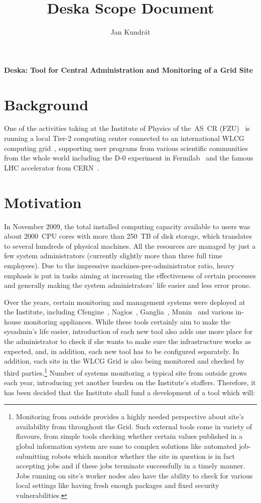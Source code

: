 \documentclass[12pt]{article}
\author{Jan Kundrát}
\title{Deska Scope Document}
\begin{document}
{\huge \textbf{Deska: Tool for Central Administration and Monitoring of a Grid Site}}

\vspace{0.5in}

\section{Background}

One of the activities taking at the Institute of Physics of the~AS~CR (FZU)~\cite{fzu} is running a local Tier-2 computing center
connected to an international WLCG computing grid~\cite{wlcg}, supporting user programs from various scientific communities from
the whole world including the D-0 experiment in Fermilab~\cite{d0} and the famous LHC accelerator from CERN~\cite{lhc}.

\section{Motivation}

In November 2009, the total installed computing capacity available to users was about 2000~CPU cores with more than 250~TB of
disk storage, which translates to several hundreds of physical machines.  All the resources are managed by just a few system
administrators (currently slightly more than three full time employees).  Due to the impressive machines-per-administrator ratio,
heavy emphasis is put in tasks aiming at increasing the effectiveness of certain processes and generally making the system
administrators' life easier and less error prone.

Over the years, certain monitoring and management systems were deployed at the Institute, including Cfengine~\cite{cfengine},
Nagios~\cite{nagios}, Ganglia~\cite{ganglia}, Munin~\cite{munin} and various in-house monitoring appliances.  While these tools
certainly aim to make the sysadmin's life easier, introduction of each new tool also adds one more place for the administrator to
check if she wants to make sure the infrastructure works as expected, and, in addition, each new tool has to be configured
separately.  In addition, each site in the WLCG Grid is also being monitored and checked by third parties.\footnote{Monitoring from
outside provides a highly needed perspective about site's availability from throughout the Grid.  Such external tools come in
variety of flavours, from simple tools checking whether certain values published in a global information system are sane to
complex solutions like automated job-submitting robots which monitor whether the site in question is in fact accepting jobs and if
these jobs terminate successfully in a timely manner.  Jobs running on site's worker nodes also have the ability to check for
various local settings like having fresh enough packages and fixed security vulnerabilities.}  Number of systems
monitoring a typical site from outside grows each year, introducing yet another burden on the Institute's staffers.  Therefore, it
has been decided that the Institute shall fund a development of a tool which will:
\end{document}
